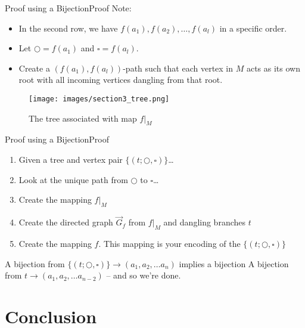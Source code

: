 \documentclass[10pt]{beamer}
\theoremstyle{definition}
\newcommand{\Sthree}{Proof using a Bijection}
\newcommand{\SthreeSSproof}{Proof}
\newcommand{\Sfour}{Conclusion}
\begin{document}
\begin{frame}{\Sthree}{\SthreeSSproof}
Note:
\begin{itemize}
  \item In the second row, we have $f(a_{1}), f(a_{2}), \ldots, f(a_{l})$ in a specific order.
  \pause{}
  \item Let $\bigcirc=f(a_{1})$ and $\square=f(a_{l})$. 
  \pause{}
  \item Create a $(f(a_{1}),f(a_{l}))$-path such that each vertex in $M$ acts as its own root with all incoming vertices dangling from that root.
\end{itemize}

\pause{} 

\begin{figure}
  \texttt{[image: images/section3\_tree.png]}
  \caption{The tree associated with map $f|_{M}$}
  \label{fig:section3_tree}
\end{figure}

\end{frame}

\begin{frame}{\Sthree}{\SthreeSSproof}
\begin{enumerate}
  \item Given a tree and vertex pair $\{(t; \bigcirc, \square)\}$\ldots
  \pause{}
  \item Look at the unique path from $\bigcirc$ to $\square$\ldots
  \pause{}
  \item Create the mapping $f|_{M}$
  \pause{}
  \item Create the directed graph $\vec G_{f}$ from $f|_{M}$ and dangling branches $t$
  \pause{}
  \item Create the mapping $f$. This mapping is your encoding of the $\{(t; \bigcirc, \square)\}$
\end{enumerate}
  
\pause{}
  
A bijection from $\{(t; \bigcirc, \square)\} \rightarrow (a_{1},a_{2},\ldots a_{n})$ implies a bijection A bijection from $t \rightarrow (a_{1},a_{2},\ldots a_{n-2})$ -- and so we're done.
  
\end{frame}

\section{\Sfour}
\end{document}
